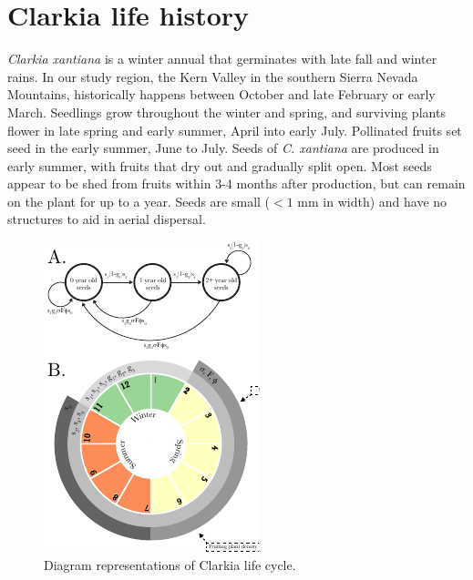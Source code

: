 \documentclass[12pt, oneside, titlepage]{article}   	%
\begin{document}
\tableofcontents

\clearpage

\section{Clarkia life history}

\textit{Clarkia xantiana} is a winter annual that germinates with late fall and winter rains. In our study region, the Kern Valley in the southern Sierra Nevada Mountains, historically happens between October and late February or early March. Seedlings grow throughout the winter and spring, and surviving plants flower in late spring and early summer, April into early July. Pollinated fruits set seed in the early summer, June to July. Seeds of \textit{C. xantiana} are produced in early summer, with fruits that dry out and gradually split open. Most seeds appear to be shed from fruits within 3-4 months after production, but can remain on the plant for up to a year. Seeds are small ($<1$ mm in width) and have no structures to aid in aerial dispersal. 

\begin{figure}
       \includegraphics[scale=1.9]{../../manuscript/figures/model-figure.pdf}  
        \caption{ Diagram representations of Clarkia life cycle. }
        \label{fig:life-cycle}
\end{figure}
\end{document}

